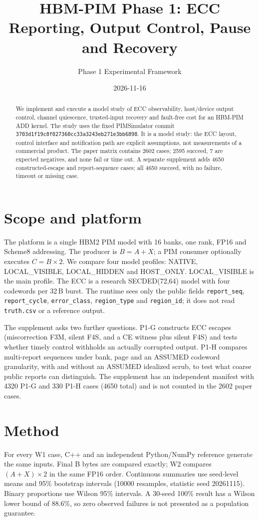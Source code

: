 \documentclass[10pt]{article}
\title{HBM-PIM Phase 1: ECC Reporting, Output Control, Pause and Recovery}
\author{Phase 1 Experimental Framework}
\date{2026-11-16}
\begin{document}
\maketitle

\begin{abstract}
We implement and execute a model study of ECC observability, host/device output
control, channel quiescence, trusted-input recovery and fault-free cost for an
HBM-PIM ADD kernel. The study uses the fixed PIMSimulator commit
\texttt{3703d1f19c8f027360cc33a3243eb271e3bb6898}. It is a model study: the
ECC layout, control interface and notification path are explicit assumptions,
not measurements of a commercial product. The paper matrix contains 2602 cases;
2595 succeed, 7 are expected negatives, and none fail or time out. A separate
supplement adds 4650 constructed-escape and report-sequence cases; all 4650
succeed, with no failure, timeout or missing case.
\end{abstract}

\section{Scope and platform}
The platform is a single HBM2 PIM model with 16 banks, one rank, FP16 and
Scheme8 addressing. The producer is $B=A+X$; a PIM consumer optionally executes
$C=B\times2$. We compare four model profiles: NATIVE, LOCAL\_VISIBLE,
LOCAL\_HIDDEN and HOST\_ONLY. LOCAL\_VISIBLE is the main profile. The ECC is a
research SECDED(72,64) model with four codewords per 32\,B burst. The runtime
sees only the public fields \texttt{report\_seq}, \texttt{report\_cycle},
\texttt{error\_class}, \texttt{region\_type} and \texttt{region\_id}; it does
not read \texttt{truth.csv} or a reference output.

The supplement asks two further questions. P1-G constructs ECC escapes
(miscorrection F3M, silent F4S, and a CE witness plus silent F4S) and tests
whether timely control withholds an actually corrupted output. P1-H compares
multi-report sequences under bank, page and an ASSUMED codeword granularity,
with and without an ASSUMED idealized scrub, to test what coarse public reports
can distinguish. The supplement has an independent manifest with 4320 P1-G and
330 P1-H cases (4650 total) and is not counted in the 2602 paper cases.

\section{Method}
For every W1 case, C++ and an independent Python/NumPy reference generate the
same inputs. Final B bytes are compared exactly; W2 compares $(A+X)\times2$ in
the same FP16 order. Continuous summaries use seed-level means and 95\%
bootstrap intervals (10000 resamples, statistic seed 20261115). Binary
proportions use Wilson 95\% intervals. A 30-seed 100\% result has a Wilson lower
bound of 88.6\%, so zero observed failures is not presented as a population
guarantee.
\end{document}
